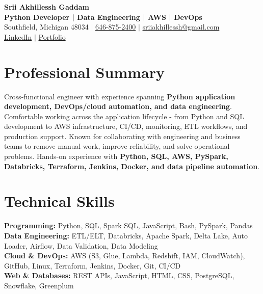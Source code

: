 \documentclass[letterpaper,10pt]{article}
\begin{document}
\fontsize{9.35pt}{10.45pt}\selectfont

\begin{center}
    {\LARGE \textbf{Srii Akhillessh Gaddam}} \\[-1pt]
    \textbf{Python Developer | Data Engineering | AWS | DevOps} \\[2pt]
    Southfield, Michigan 48034 $|$
    \href{tel:6468752400}{646-875-2400} $|$
    \href{mailto:sriiakhillessh@gmail.com}{sriiakhillessh@gmail.com} \\[1pt]
    \href{https://www.linkedin.com/in/srii-akhiilessh-gaddam-b48668191/}{LinkedIn} $|$
    \href{https://sriiakhillesshg.github.io/portfolio/}{Portfolio}
\end{center}
\vspace{-8pt}

\section{Professional Summary}
\small{Cross-functional engineer with experience spanning \textbf{Python application development, DevOps/cloud automation, and data engineering}. Comfortable working across the application lifecycle - from Python and SQL development to AWS infrastructure, CI/CD, monitoring, ETL workflows, and production support. Known for collaborating with engineering and business teams to remove manual work, improve reliability, and solve operational problems. Hands-on experience with \textbf{Python, SQL, AWS, PySpark, Databricks, Terraform, Jenkins, Docker, and data pipeline automation}.}

\section{Technical Skills}
\small{
\textbf{Programming:} Python, SQL, Spark SQL, JavaScript, Bash, PySpark, Pandas \\
\textbf{Data Engineering:} ETL/ELT, Databricks, Apache Spark, Delta Lake, Auto Loader, Airflow, Data Validation, Data Modeling \\
\textbf{Cloud \& DevOps:} AWS (S3, Glue, Lambda, Redshift, IAM, CloudWatch), GitHub, Linux, Terraform, Jenkins, Docker, Git, CI/CD \\
\textbf{Web \& Databases:} REST APIs, JavaScript, HTML, CSS, PostgreSQL, Snowflake, Greenplum
}
\end{document}
